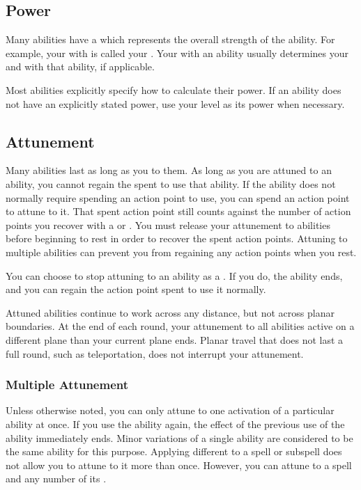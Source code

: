     \subsection{Power}\label{Power}
        Many abilities have a  which represents the overall strength of the ability.
        For example, your  with  is called your .
        Your  with an ability usually determines your  and  with that ability, if applicable.

        Most abilities explicitly specify how to calculate their power.
        If an ability does not have an explicitly stated power, use your level as its power when necessary.

    \subsection{Attunement}\label{Attunement}
        Many abilities last as long as you  to them.
        As long as you are attuned to an ability, you cannot regain the  spent to use that ability.
        If the ability does not normally require spending an action point to use, you can spend an action point to attune to it.
        That spent action point still counts against the number of action points you recover with a  or .
        You must release your attunement to abilities before beginning to rest in order to recover the spent action points.
        Attuning to multiple abilities can prevent you from regaining any action points when you rest.

        You can choose to stop attuning to an ability as a .
        If you do, the ability ends, and you can regain the action point spent to use it normally.

        Attuned abilities continue to work across any distance, but not across planar boundaries.
        At the end of each round, your attunement to all abilities active on a different plane than your current plane ends.
        Planar travel that does not last a full round, such as teleportation, does not interrupt your attunement.

        \subsubsection{Multiple Attunement}\label{Multiple Attunement}
            Unless otherwise noted, you can only attune to one activation of a particular ability at once.
            If you use the ability again, the effect of the previous use of the ability immediately ends.
            Minor variations of a single ability are considered to be the same ability for this purpose.
            Applying different  to a spell or subspell does not allow you to attune to it more than once.
            However, you can attune to a spell and any number of its .

